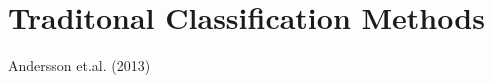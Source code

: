 \section{Traditonal Classification Methods} \label{sec:pr_TraditionalClassificationMethods}

Andersson et.al. (2013)